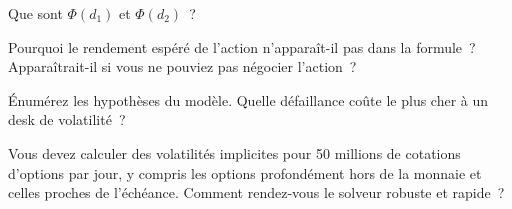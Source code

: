 \begin{interviewq}\label{iq:dv:black-scholes-three-ways:3}
Que sont $\Phi(d_1)$ et $\Phi(d_2)$~?
\end{interviewq}

\begin{interviewq}\label{iq:dv:black-scholes-three-ways:4}
Pourquoi le rendement espéré de l'action n'apparaît-il pas dans la formule~? Apparaîtrait-il
si vous ne pouviez pas négocier l'action~?
\end{interviewq}

\begin{interviewq}\label{iq:dv:black-scholes-three-ways:5}
Énumérez les hypothèses du modèle. Quelle défaillance coûte le plus cher à un desk de volatilité~?
\end{interviewq}

\begin{interviewq}\label{iq:dv:black-scholes-three-ways:6}
Vous devez calculer des volatilités implicites pour 50 millions de cotations d'options par jour,
y compris les options profondément hors de la monnaie et celles proches de l'échéance. Comment rendez-vous le
solveur robuste et rapide~?
\end{interviewq}
